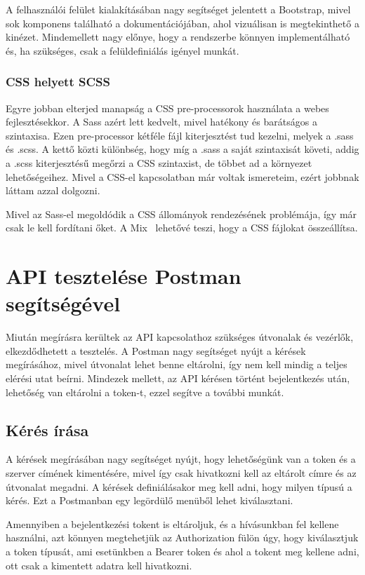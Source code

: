 \documentclass[
]{thesis-ekf}
\theoremstyle{definition}
\theoremstyle{remark}
\begin{document}
	A felhasználói felület kialakításában nagy segítséget jelentett a Bootstrap, mivel sok komponens található a dokumentációjában, ahol vizuálisan is megtekinthető a kinézet. Mindemellett nagy előnye, hogy a rendszerbe könnyen implementálható és, ha szükséges, csak a felüldefiniálás igényel munkát.
	
	\subsection{CSS helyett SCSS}
	
	Egyre jobban elterjed manapság a CSS pre-processorok használata a webes fejlesztésekkor. A Sass azért lett kedvelt, mivel hatékony és barátságos a szintaxisa. Ezen pre-processor kétféle fájl kiterjesztést tud kezelni, melyek a .sass és .scss. A kettő közti különbség, hogy míg a .sass a saját szintaxisát követi, addig a .scss kiterjesztésű megőrzi a CSS szintaxist, de többet ad a környezet lehetőségeihez. Mivel a CSS-el kapcsolatban már voltak ismereteim, ezért jobbnak láttam azzal dolgozni. 
	
	Mivel az Sass-el megoldódik a CSS állományok rendezésének problémája, így már csak le kell fordítani őket. A Mix~\cite{laravel_mix} lehetővé teszi, hogy a CSS fájlokat összeállítsa.  
	
	\chapter{API tesztelése Postman segítségével}
	Miután megírásra kerültek az API kapcsolathoz szükséges útvonalak és vezérlők, elkezdődhetett a tesztelés. A Postman nagy segítséget nyújt a kérések megírásához, mivel útvonalat lehet benne eltárolni, így nem kell mindig a teljes elérési utat beírni. Mindezek mellett, az API kérésen történt bejelentkezés után, lehetőség van eltárolni a token-t, ezzel segítve a további munkát. 
	
	\section{Kérés írása}
	A kérések megírásában nagy segítséget nyújt, hogy lehetőségünk van a token és a szerver címének kimentésére, mivel így csak hivatkozni kell az eltárolt címre és az útvonalat megadni. A kérések definiálásakor meg kell adni, hogy milyen típusú a kérés. Ezt a Postmanban egy legördülő menüből lehet kiválasztani. 
	
	Amennyiben a bejelentkezési tokent is eltároljuk, és a hívásunkban fel kellene használni, azt könnyen megtehetjük az Authorization fülön úgy, hogy kiválasztjuk a token típusát, ami esetünkben a Bearer token és ahol a tokent meg kellene adni, ott csak a kimentett adatra kell hivatkozni. 
	
\end{document}
